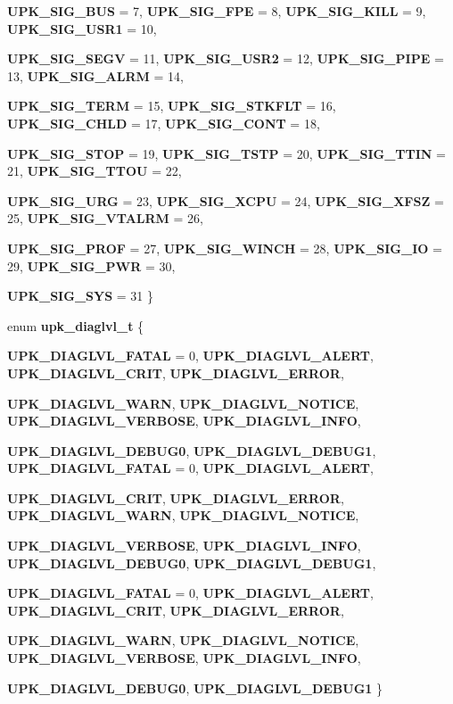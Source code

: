 \begin{DoxyCompactItemize}
\par
{\bf UPK\_\-SIG\_\-BUS} =  7, 
{\bf UPK\_\-SIG\_\-FPE} =  8, 
{\bf UPK\_\-SIG\_\-KILL} =  9, 
{\bf UPK\_\-SIG\_\-USR1} =  10, 
\par
{\bf UPK\_\-SIG\_\-SEGV} =  11, 
{\bf UPK\_\-SIG\_\-USR2} =  12, 
{\bf UPK\_\-SIG\_\-PIPE} =  13, 
{\bf UPK\_\-SIG\_\-ALRM} =  14, 
\par
{\bf UPK\_\-SIG\_\-TERM} =  15, 
{\bf UPK\_\-SIG\_\-STKFLT} =  16, 
{\bf UPK\_\-SIG\_\-CHLD} =  17, 
{\bf UPK\_\-SIG\_\-CONT} =  18, 
\par
{\bf UPK\_\-SIG\_\-STOP} =  19, 
{\bf UPK\_\-SIG\_\-TSTP} =  20, 
{\bf UPK\_\-SIG\_\-TTIN} =  21, 
{\bf UPK\_\-SIG\_\-TTOU} =  22, 
\par
{\bf UPK\_\-SIG\_\-URG} =  23, 
{\bf UPK\_\-SIG\_\-XCPU} =  24, 
{\bf UPK\_\-SIG\_\-XFSZ} =  25, 
{\bf UPK\_\-SIG\_\-VTALRM} =  26, 
\par
{\bf UPK\_\-SIG\_\-PROF} =  27, 
{\bf UPK\_\-SIG\_\-WINCH} =  28, 
{\bf UPK\_\-SIG\_\-IO} =  29, 
{\bf UPK\_\-SIG\_\-PWR} =  30, 
\par
{\bf UPK\_\-SIG\_\-SYS} =  31
 \}
\item 
enum {\bf upk\_\-diaglvl\_\-t} \{ \par
{\bf UPK\_\-DIAGLVL\_\-FATAL} =  0, 
{\bf UPK\_\-DIAGLVL\_\-ALERT}, 
{\bf UPK\_\-DIAGLVL\_\-CRIT}, 
{\bf UPK\_\-DIAGLVL\_\-ERROR}, 
\par
{\bf UPK\_\-DIAGLVL\_\-WARN}, 
{\bf UPK\_\-DIAGLVL\_\-NOTICE}, 
{\bf UPK\_\-DIAGLVL\_\-VERBOSE}, 
{\bf UPK\_\-DIAGLVL\_\-INFO}, 
\par
{\bf UPK\_\-DIAGLVL\_\-DEBUG0}, 
{\bf UPK\_\-DIAGLVL\_\-DEBUG1}, 
{\bf UPK\_\-DIAGLVL\_\-FATAL} =  0, 
{\bf UPK\_\-DIAGLVL\_\-ALERT}, 
\par
{\bf UPK\_\-DIAGLVL\_\-CRIT}, 
{\bf UPK\_\-DIAGLVL\_\-ERROR}, 
{\bf UPK\_\-DIAGLVL\_\-WARN}, 
{\bf UPK\_\-DIAGLVL\_\-NOTICE}, 
\par
{\bf UPK\_\-DIAGLVL\_\-VERBOSE}, 
{\bf UPK\_\-DIAGLVL\_\-INFO}, 
{\bf UPK\_\-DIAGLVL\_\-DEBUG0}, 
{\bf UPK\_\-DIAGLVL\_\-DEBUG1}, 
\par
{\bf UPK\_\-DIAGLVL\_\-FATAL} =  0, 
{\bf UPK\_\-DIAGLVL\_\-ALERT}, 
{\bf UPK\_\-DIAGLVL\_\-CRIT}, 
{\bf UPK\_\-DIAGLVL\_\-ERROR}, 
\par
{\bf UPK\_\-DIAGLVL\_\-WARN}, 
{\bf UPK\_\-DIAGLVL\_\-NOTICE}, 
{\bf UPK\_\-DIAGLVL\_\-VERBOSE}, 
{\bf UPK\_\-DIAGLVL\_\-INFO}, 
\par
{\bf UPK\_\-DIAGLVL\_\-DEBUG0}, 
{\bf UPK\_\-DIAGLVL\_\-DEBUG1}
 \}
\item 

\end{DoxyCompactItemize}
